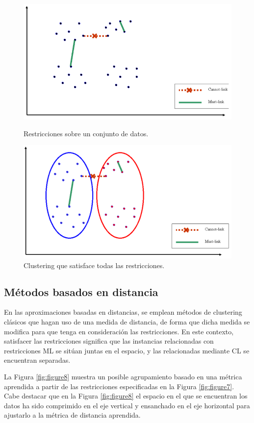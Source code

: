\begin{figure}[bth]
	\myfloatalign
	{\includegraphics[width=.6\linewidth]{imagenes/c3/InputInstancesAndConst1}
	\caption[Restricciones sobre un conjunto de datos.]{Restricciones sobre un conjunto de datos. \cite{Survey:2007}} \label{fig:figure5}
	}
	{\includegraphics[width=.6\linewidth]{imagenes/c3/ClusteringSatAll}
	\caption[Clustering que satisface todas las restricciones.]{Clustering que satisface todas las restricciones. \cite{Survey:2007}} \label{fig:figure6}
	}
\end{figure}

\subsection{Métodos basados en distancia}

En las aproximaciones basadas en distancias, se emplean métodos de clustering clásicos que hagan uso de una medida de distancia, de forma que dicha medida se modifica para que tenga en consideración las restricciones. En este contexto, satisfacer las restricciones significa que las instancias relacionadas con restricciones \acf{ML} se sitúan juntas en el espacio, y las relacionadas mediante \acf{CL} se encuentran separadas.

La Figura \ref{fig:figure8} muestra un posible agrupamiento basado en una métrica aprendida a partir de las restricciones especificadas en la Figura \ref{fig:figure7}. Cabe destacar que en la Figura \ref{fig:figure8} el espacio en el que se encuentran los datos ha sido comprimido en el eje vertical y ensanchado en el eje horizontal para ajustarlo a la métrica de distancia aprendida.

